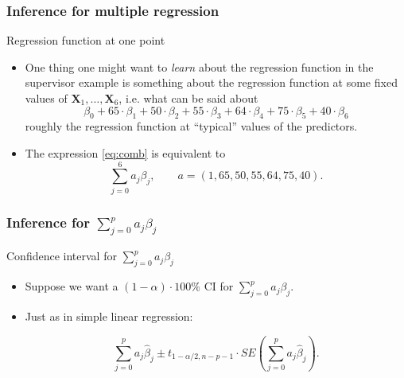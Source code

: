 \documentclass[handout]{beamer}
\begin{document}

   \begin{frame} \frametitle{Inference for multiple regression}

   \begin{block}
   {Regression function at one point}

   \begin{itemize}
   \item One thing one might want to {\em learn} about the regression function in the supervisor example is something about the regression function at some fixed values of $\pmb{X}_{1}, \dots, \pmb{X}_{6}$, i.e. what can be said about
   \begin{equation}
   \label{eq:comb}
   \beta_0 + 65 \cdot \beta_1  + 50 \cdot \beta_2  + 55 \cdot \beta_3 + 64 \cdot \beta_4 + 75 \cdot \beta_5 + 40 \cdot \beta_6   \tag{*}
   \end{equation}
   roughly the regression function at ``typical'' values of the predictors.

   \item The expression \eqref{eq:comb} is equivalent to
   $$
   \sum_{j=0}^6 a_j \beta_j, \qquad a=(1,65,50,55,64,75,40).$$
   \end{itemize}
   \end{block}
   \end{frame}


   \begin{frame} \frametitle{Inference for $\sum_{j=0}^p a_j \beta_j$}

   \begin{block}
   {Confidence interval for $\sum_{j=0}^p a_j \beta_j$}
   \begin{itemize}
   \item Suppose we want  a $(1-\alpha)\cdot 100\%$ CI for $\sum_{j=0}^p a_j\beta_j$.

   \item Just as in simple linear regression:

   $$
   \sum_{j=0}^p a_j \widehat{\beta}_j \pm t_{1-\alpha/2, n-p-1} \cdot SE\left(\sum_{j=0}^p a_j\widehat{\beta}_j\right).$$
   \end{itemize}
   \end{block}
   \end{frame}

\end{document}
